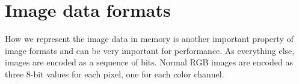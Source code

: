\section{Image data formats}
How we represent the image data in memory is another important property of image formats and can be very important for performance.
As everything else, images are encoded as a sequence of bits.
Normal RGB images are encoded as three 8-bit values for each pixel, one for each color channel.



\subsection{}


